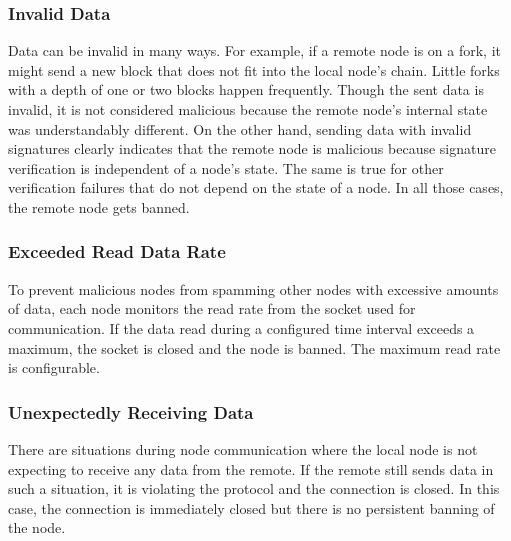 \subsubsection*{Invalid Data}
Data can be invalid in many ways.
For example, if a remote node is on a fork, it might send a new block that does not fit into the local node's chain.
Little forks with a depth of one or two blocks happen frequently.
Though the sent data is invalid, it is not considered malicious because the remote node's internal state was understandably different.
On the other hand, sending data with invalid signatures clearly indicates that the remote node is malicious because signature verification is independent of a node's state.
The same is true for other verification failures that do not depend on the state of a node.
In all those cases, the remote node gets banned.

\subsubsection*{Exceeded Read Data Rate}
To prevent malicious nodes from spamming other nodes with excessive amounts of data, each node monitors the read rate from the socket used for communication.
If the data read during a configured time interval exceeds a maximum, the socket is closed and the node is banned.
The maximum read rate is configurable.

\subsubsection*{Unexpectedly Receiving Data}
There are situations during node communication where the local node is not expecting to receive any data from the remote.
If the remote still sends data in such a situation, it is violating the protocol and the connection is closed.
In this case, the connection is immediately closed but there is no persistent banning of the node.
